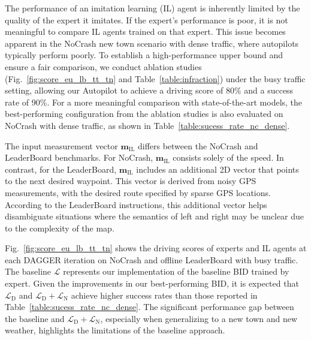 \hspace{1pc}The performance of an imitation learning (IL) agent is inherently limited by the quality of the expert it imitates. 
If the expert's performance is poor, it is not meaningful to compare IL agents trained on that expert. 
This issue becomes apparent in the NoCrash new town scenario with dense traffic, where autopilots typically perform poorly. 
To establish a high-performance upper bound and ensure a fair comparison, we conduct ablation studies (Fig.~\ref{fig:score_eu_lb_tt_tn} and Table~\ref{table:infraction}) under the busy traffic setting, allowing our Autopilot to achieve a driving score of 80\% and a success rate of 90\%. 
For a more meaningful comparison with state-of-the-art models, the best-performing configuration from the ablation studies is also evaluated on NoCrash with dense traffic, as shown in Table~\ref{table:sucess_rate_nc_dense}.


The input measurement vector $\mathbf{m}_\text{IL}$ differs between the NoCrash and LeaderBoard benchmarks.
For NoCrash, $\mathbf{m}_\text{IL}$ consists solely of the speed.
In contrast, for the LeaderBoard, $\mathbf{m}_\text{IL}$ includes an additional 2D vector that points to the next desired waypoint. 
This vector is derived from noisy GPS measurements, with the desired route specified by sparse GPS locations. 
According to the LeaderBoard instructions, this additional vector helps disambiguate situations where the semantics of left and right may be unclear due to the complexity of the map.


Fig.~\ref{fig:score_eu_lb_tt_tn} shows the driving scores of experts and IL agents at each DAGGER iteration on NoCrash and offline LeaderBoard with busy traffic.
The baseline $\mathcal{L}$ represents our implementation of the baseline BID trained by expert. 
Given the improvements in our best-performing BID, it is expected that $\mathcal{L}_\text{D}$ and $\mathcal{L}_\text{D} + \mathcal{L}_\text{N}$ achieve higher success rates than those reported in Table~\ref{table:sucess_rate_nc_dense}.
The significant performance gap between the baseline and $\mathcal{L}_\text{D} + \mathcal{L}_\text{N}$, especially when generalizing to a new town and new weather, highlights the limitations of the baseline approach.


